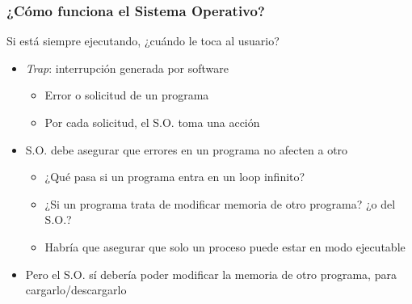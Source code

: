 \documentclass[letter]{beamer}
\begin{document}
\begin{frame}
  \frametitle{¿Cómo funciona el Sistema Operativo?}
  
  \begin{block}{Si está siempre ejecutando, ¿cuándo le toca al usuario?}
  \end{block}
  
  \begin{itemize}
    \item<4-> {\em Trap}: interrupción generada por software
      \begin{itemize}
        \item Error o solicitud de un programa
        \item Por cada solicitud, el S.O. toma una acción
      \end{itemize}
    \item<5-> S.O. debe asegurar que errores en un programa no afecten a otro
      \begin{itemize}
        \item<6-> ¿Qué pasa si un programa entra en un loop infinito?
        \item<6-> ¿Si un programa trata de modificar memoria de otro programa? ¿o del S.O.?
        \item<7-> Habría que asegurar que solo un proceso puede estar en modo ejecutable
      \end{itemize}
    \item<8-> Pero el S.O. sí debería poder modificar la memoria de otro programa, para cargarlo/descargarlo  
  \end{itemize}

\end{frame}
\end{document}
